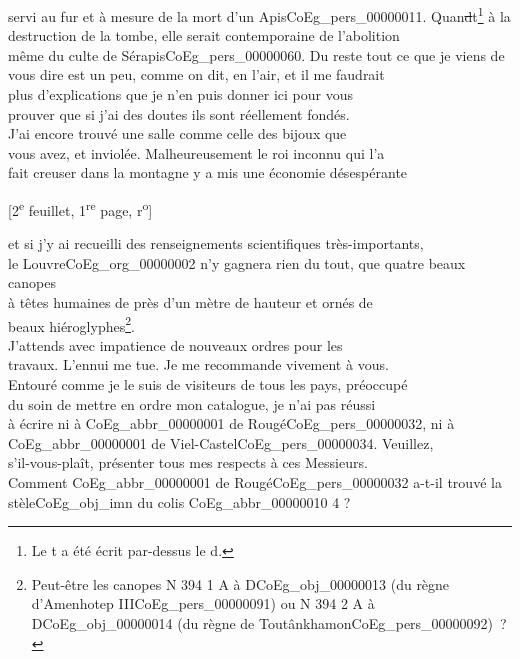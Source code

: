 \documentclass{book}
\begin{document}
servi au fur et à mesure de la mort d’un Apis\gls{CoEg_pers_00000011}. Quan\sout{d}t\footnote{Le t a été écrit par-dessus le d.} à la\\
destruction de la tombe, elle serait contemporaine de l’abolition\\
même du culte de Sérapis\gls{CoEg_pers_00000060}. Du reste tout ce que je viens de\\
vous dire est un peu, comme on dit, en l’air, et il me faudrait\\
plus d’explications que je n’en puis donner ici pour vous\\
prouver que si j’ai des doutes ils sont réellement fondés.\\
\indent J’ai encore trouvé une salle comme celle des bijoux que\\
vous avez, et inviolée. Malheureusement le roi inconnu qui l’a\\
fait creuser dans la montagne y a mis une économie désespérante
{\footnotesize\begin{center} {[2\textsuperscript{e} feuillet, 1\textsuperscript{re} page, r\textsuperscript{o}]}\end{center}}
\noindent et si j’y ai recueilli des renseignements scientifiques très-importants,\\
le Louvre\gls{CoEg_org_00000002} n’y gagnera rien du tout, que quatre beaux canopes\\
à têtes humaines de près d’un mètre de hauteur et ornés de\\
beaux hiéroglyphes\footnote{Peut-être les canopes N 394 1 A à D\gls{CoEg_obj_00000013} (du règne d'Amenhotep III\gls{CoEg_pers_00000091}) ou N 394 2 A à D\gls{CoEg_obj_00000014} (du règne de Toutânkhamon\gls{CoEg_pers_00000092})~?}.\\
\indent J’attends avec impatience de nouveaux ordres pour les\\
travaux. L’ennui me tue. Je me recommande vivement à vous.\\
Entouré comme je le suis de visiteurs de tous les pays, préoccupé\\
du soin de mettre en ordre mon catalogue, je n’ai pas réussi\\
à écrire ni à \gls{CoEg_abbr_00000001} de Rougé\gls{CoEg_pers_00000032}, ni à \gls{CoEg_abbr_00000001} de Viel-Castel\gls{CoEg_pers_00000034}. Veuillez,\\
s’il-vous-plaît, présenter tous mes respects à ces Messieurs.\\
Comment \gls{CoEg_abbr_00000001} de Rougé\gls{CoEg_pers_00000032} a-t-il trouvé la stèle\gls{CoEg_obj_imn} du colis \gls{CoEg_abbr_00000010} 4 ?\\
\end{document}
